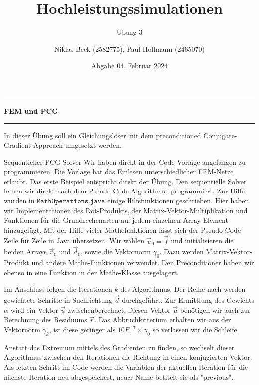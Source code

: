 \documentclass[
ngerman,
subtask=ruled %
]{tudaexercise}
\begin{document}
	
	\title[Übung Hochleistungssimulationen]{Hochleistungssimulationen}
	\subtitle{\"Ubung 3}
	\author{Niklas Beck (2582775), Paul Hollmann (2465070)}
	\date{Abgabe 04. Februar 2024}
	\maketitle
	
	\hrule
	{\Large \textbf{ FEM und PCG }} \vspace{2mm}
	\hrule

	In dieser Übung soll ein Gleichungslöser mit dem preconditioned Conjugate-Gradient-Approach umgesetzt werden.

	\begin{task}{Sequentieller PCG-Solver}
		Wir haben direkt in der Code-Vorlage angefangen zu programmieren. Die Vorlage hat das Einlesen unterschiedlicher FEM-Netze erlaubt. Das erste Beispiel entspricht direkt der Übung.
		Den sequentielle Solver haben wir direkt nach dem Pseudo-Code Algorithmus programmiert. Zur Hilfe wurden in $\mathtt{MathOperations.java}$ einige Hilfsfunktionen geschrieben. Hier haben wir Implementationen des Dot-Produkts, der Matrix-Vektor-Multiplikation und Funktionen für die Grundrechenarten auf jedem einzelnen Array-Element hinzugefügt.
		Mit der Hilfe vieler Mathefunktionen lässt sich der Pseudo-Code Zeile für Zeile in Java übersetzen.
		Wir wählen $\vec{v}_0 = \vec{f}$ und initialisieren die beiden Arrays $\vec{r}_0$ und $\vec{d}_0$, sowie die Vektornorm $\gamma_0$. Dazu werden Matrix-Vektor-Produkt und andere Mathe-Funktionen verwendet. Den Preconditioner haben wir ebenso in eine Funktion in der Mathe-Klasse ausgelagert.
		
		Im Anschluss folgen die Iterationen $k$ des Algorithmus. Der Reihe nach werden gewichtete Schritte in Suchrichtung $\vec{d}$ durchgeführt. Zur Ermittlung des Gewichts $\alpha$ wird ein Vektor $\vec{u}$ zwischenberechnet. Diesen Vektor $\vec{u}$ benötigen wir auch zur Berechnung des Residuums $\vec{r}$.
		Das Abbruchkriterium erhalten wir aus der Vektornorm $\gamma_k$, ist diese geringer als $10 E^{-7} \times \gamma_0$ so verlassen wir die Schleife.
		
		Anstatt das Extremum mittels des Gradienten zu finden, so wechselt dieser Algorithmus zwischen den Iterationen die Richtung in einen konjugierten Vektor.
		Als letzten Schritt im Code werden die Variablen der aktuellen Iteration für die nächste Iteration neu abgespeichert, neuer Name betitelt sie als "previous".
	\end{task}	
\end{document}
